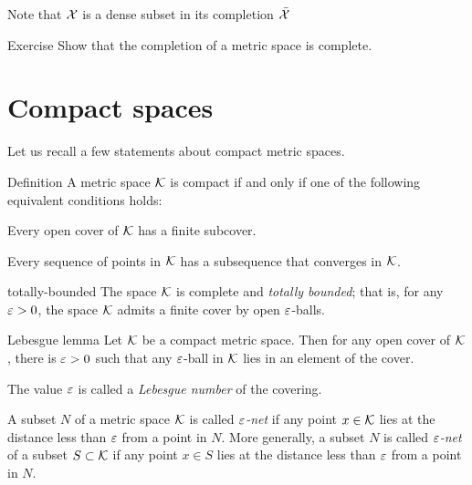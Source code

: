 Note that $\mathcal{X}$ is a dense subset in its completion $\bar{\mathcal{X}}$

\begin{thm}{Exercise}\label{ex:complete-completion}
Show that the completion of a metric space is complete.
\end{thm}


\section{Compact spaces}

Let us recall a few statements about compact metric spaces.

\begin{thm}{Definition}\label{def:compact}
A metric space $\mathcal{K}$ is compact if and only if one of the following equivalent conditions holds:

\begin{subthm}{}
 Every open cover of $\mathcal{K}$ has a finite subcover.
\end{subthm}

\begin{subthm}{}
 Every sequence of points in $\mathcal{K}$ has a subsequence that converges in $\mathcal{K}$.
\end{subthm}

\begin{subthm}{totally-bounded}
The space $\mathcal{K}$ is complete and \emph{totally bounded}; that is, for any $\varepsilon>0$, the space $\mathcal{K}$ admits a finite cover by open $\varepsilon$-balls.
\end{subthm}

\end{thm}

\begin{thm}{Lebesgue lemma}
Let $\mathcal{K}$ be a compact metric space.
Then for any open cover of $\mathcal{K}$, there is $\varepsilon>0$ such that any $\varepsilon$-ball in $\mathcal{K}$ lies in an element of the cover.

The value $\varepsilon$ is called a \emph{Lebesgue number} of the covering.
\end{thm}

A subset $N$ of a metric space $\mathcal{K}$ is called \emph{$\varepsilon$-net} if any point $x\in \mathcal{K}$ lies at the distance less than $\varepsilon$ from a point in $N$.
More generally, a subset $N$ is called \emph{$\varepsilon$-net} of a subset $S\subset\mathcal{K}$ if any point $x\in S$ lies at the distance less than $\varepsilon$ from a point in $N$. 

